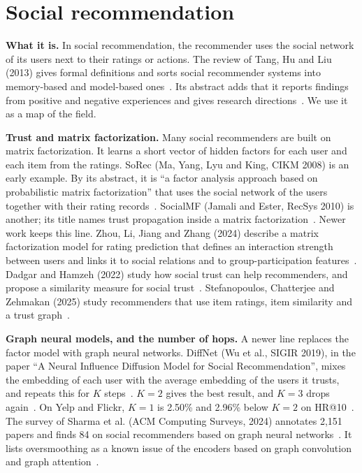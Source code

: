 \section{Social recommendation}
\label{sec:lit-social}

\textbf{What it is.} In social recommendation, the recommender uses the social network of its users next to their ratings or actions. The review of Tang, Hu and Liu (2013) gives formal definitions and sorts social recommender systems into memory-based and model-based ones~. Its abstract adds that it reports findings from positive and negative experiences and gives research directions~. We use it as a map of the field.

\textbf{Trust and matrix factorization.} Many social recommenders are built on matrix factorization. It learns a short vector of hidden factors for each user and each item from the ratings. SoRec (Ma, Yang, Lyu and King, CIKM 2008) is an early example. By its abstract, it is ``a factor analysis approach based on probabilistic matrix factorization'' that uses the social network of the users together with their rating records~. SocialMF (Jamali and Ester, RecSys 2010) is another; its title names trust propagation inside a matrix factorization~. Newer work keeps this line. Zhou, Li, Jiang and Zhang (2024) describe a matrix factorization model for rating prediction that defines an interaction strength between users and links it to social relations and to group-participation features~. Dadgar and Hamzeh (2022) study how social trust can help recommenders, and propose a similarity measure for social trust~. Stefanopoulos, Chatterjee and Zehmakan (2025) study recommenders that use item ratings, item similarity and a trust graph~.

\textbf{Graph neural models, and the number of hops.} A newer line replaces the factor model with graph neural networks. DiffNet (Wu et al., SIGIR 2019), in the paper ``A Neural Influence Diffusion Model for Social Recommendation'', mixes the embedding of each user with the average embedding of the users it trusts, and repeats this for $K$ steps~. $K = 2$ gives the best result, and $K = 3$ drops again~. On Yelp and Flickr, $K = 1$ is 2.50\% and 2.96\% below $K = 2$ on HR@10~. The survey of Sharma et al. (ACM Computing Surveys, 2024) annotates 2,151 papers and finds 84 on social recommenders based on graph neural networks~. It lists oversmoothing as a known issue of the encoders based on graph convolution and graph attention~.

